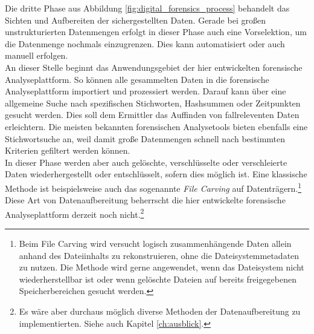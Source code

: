 \noindent
Die dritte Phase aus Abbildung \ref{fig:digital_forensics_process} behandelt das Sichten und Aufbereiten der sichergestellten Daten. Gerade bei großen unstrukturierten Datenmengen erfolgt in dieser Phase auch eine Vorselektion, um die Datenmenge nochmals einzugrenzen. Dies kann automatisiert oder auch manuell erfolgen.\cite[S. 33-39]{digital_forensics}\\
An dieser Stelle beginnt das Anwendungsgebiet der hier entwickelten forensische Analyseplattform. So können alle gesammelten Daten in die forensische Analyseplattform importiert und prozessiert werden. Darauf kann über eine allgemeine Suche nach spezifischen Stichworten, Hashsummen oder Zeitpunkten gesucht werden. 
Dies soll dem Ermittler das Auffinden von fallreleventen Daten erleichtern. Die meisten bekannten forensischen Analysetools bieten ebenfalls eine Stichwortsuche an, weil damit große Datenmengen schnell nach bestimmten Kriterien gefiltert werden können.\cite[S. 116-123]{handbook_digital_forensics}\\
In dieser Phase werden aber auch gelöschte, verschlüsselte oder verschleierte Daten wiederhergestellt oder entschlüsselt, sofern dies möglich ist. Eine klassische Methode ist beispielsweise auch das sogenannte \textit{File Carving} auf Datenträgern.\cite[S. 38-39]{digital_forensics}\footnote{Beim File Carving wird versucht logisch zusammenhängende Daten allein anhand des Dateiinhalts zu rekonstruieren, ohne die Dateisystemmetadaten zu nutzen. 
Die Methode wird gerne angewendet, wenn das Dateisystem nicht wiederherstellbar ist oder wenn gelöschte Dateien auf bereits freigegebenen Speicherbereichen gesucht werden.} Diese Art von Datenaufbereitung beherrscht die hier entwickelte forensische Analyseplattform derzeit noch nicht.\footnote{Es wäre aber durchaus möglich diverse Methoden der Datenaufbereitung zu implementierten. Siehe auch Kapitel \ref{ch:ausblick}.}\\

